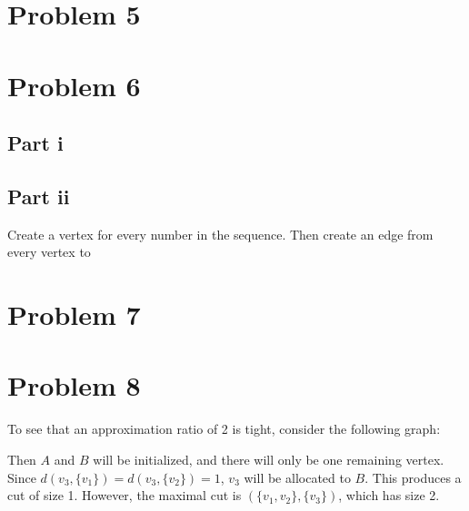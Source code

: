 \documentclass[twoside]{amsart}
\begin{document}
\section*{Problem 5}


\section*{Problem 6}

\subsection*{Part i}

\subsection*{Part ii}

Create a vertex for every number in the sequence.  Then create an edge
from every vertex to 

\section*{Problem 7}


\section*{Problem 8}

To see that an approximation ratio of 2 is tight, consider the
following graph:


Then $A$ and $B$ will be initialized, and there will only be one
remaining vertex.  Since $d(v_3,\{v_1\}) = d(v_3,\{v_2\}) = 1$, $v_3$
will be allocated to $B$.  This produces a cut of size 1.  However,
the maximal cut is $(\{v_1,v_2\},\{v_3\})$, which has size 2.
\end{document}
